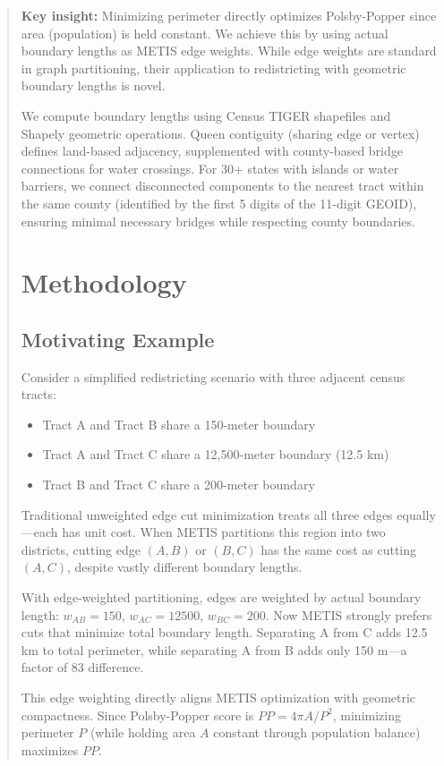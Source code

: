 \documentclass[11pt,twocolumn]{article}
\begin{document}
\begin{abstract}
\textbf{Key insight:} Minimizing perimeter directly optimizes Polsby-Popper since area (population) is held constant. We achieve this by using actual boundary lengths as METIS edge weights. While edge weights are standard in graph partitioning, their application to redistricting with geometric boundary lengths is novel.

We compute boundary lengths using Census TIGER shapefiles \cite{tiger-census} and Shapely geometric operations. Queen contiguity (sharing edge or vertex) defines land-based adjacency, supplemented with county-based bridge connections for water crossings. For 30+ states with islands or water barriers, we connect disconnected components to the nearest tract within the same county (identified by the first 5 digits of the 11-digit GEOID), ensuring minimal necessary bridges while respecting county boundaries.

\section{Methodology}

\subsection{Motivating Example}

Consider a simplified redistricting scenario with three adjacent census tracts:
\begin{itemize}
\item Tract A and Tract B share a 150-meter boundary
\item Tract A and Tract C share a 12,500-meter boundary (12.5 km)
\item Tract B and Tract C share a 200-meter boundary
\end{itemize}

Traditional unweighted edge cut minimization treats all three edges equally---each has unit cost. When METIS partitions this region into two districts, cutting edge $(A,B)$ or $(B,C)$ has the same cost as cutting $(A,C)$, despite vastly different boundary lengths.

With edge-weighted partitioning, edges are weighted by actual boundary length: $w_{AB} = 150$, $w_{AC} = 12500$, $w_{BC} = 200$. Now METIS strongly prefers cuts that minimize total boundary length. Separating A from C adds 12.5 km to total perimeter, while separating A from B adds only 150 m---a factor of 83 difference.

This edge weighting directly aligns METIS optimization with geometric compactness. Since Polsby-Popper score is $PP = 4\pi A / P^2$, minimizing perimeter $P$ (while holding area $A$ constant through population balance) maximizes $PP$.


\end{abstract}
\end{document}
